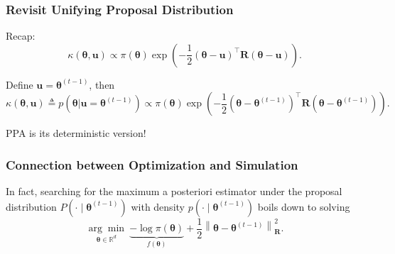 \documentclass[aspectratio=169]{beamer}
\newcommand{\B}[1]{\mathbf{#1}} %
\newcommand{\Bs}[1]{\boldsymbol{#1}} %
\newcommand{\pr}[1]{\left(#1\right)} %
\newcommand{\nr}[1]{\left\|#1\right\|} %
\begin{document}
\begin{frame}
  \frametitle{Revisit Unifying Proposal Distribution}
Recap: \[
  \kappa(\Bs{\theta},\B{u}) \propto \pi(\Bs{\theta})\exp\pr{-\frac{1}{2}(\Bs{\theta}-\B{u})^{\top}\B{R}(\Bs{\theta}-\B{u})}.\]

Define $\B{u} = \Bs{\theta}^{(t-1)}$, then
\[
    \kappa(\Bs{\theta},\B{u}) \triangleq p\pr{\Bs{\theta}|\B{u}=\Bs{\theta}^{(t-1)}} \propto \pi(\Bs{\theta})\exp\pr{-\frac{1}{2}\pr{\Bs{\theta}-\Bs{\theta}^{(t-1)}}^{\top}\B{R}\pr{\Bs{\theta}-\Bs{\theta}^{(t-1)}}}. 
\]

PPA is its deterministic version!
\end{frame}

\begin{frame}
  \frametitle{Connection between Optimization and Simulation}
  
In fact, searching for the maximum a posteriori estimator under the proposal distribution $P(\cdot \mid \Bs{\theta}^{(t-1)})$ with density $p(\cdot \mid \Bs{\theta}^{(t-1)})$ boils down to solving 
\[
    \underset{\Bs{\theta}\in\mathbb{R}^d}{\arg \min}\ \underbrace{-\log\pi(\Bs{\theta})}_{f(\Bs{\theta})} + \dfrac{1}{2}\nr{\Bs{\theta}-\Bs{\theta}^{(t-1)}}_{\B{R}}^2.
\]


\end{frame}
\end{document}
